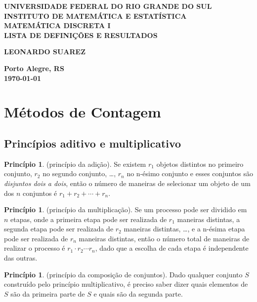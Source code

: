 \documentclass{article}
\theoremstyle{plain}
\theoremstyle{definition}
\newtheorem{prcp}[thm]{Princípio}
\theoremstyle{remark}
\begin{document}
\begin{center}
    \textbf{\large UNIVERSIDADE FEDERAL DO RIO GRANDE DO SUL} \\
    \textbf{\large INSTITUTO DE MATEMÁTICA E ESTATÍSTICA} \\
    \vspace{3cm}
    \textbf{\Large MATEMÁTICA DISCRETA I} \\
    \vspace{1cm}
    \textbf{\large LISTA DE DEFINIÇÕES E RESULTADOS} \\
    \vspace{3cm}

    \textbf{LEONARDO SUAREZ}

    \vfill
    \textbf{\large Porto Alegre, RS} \\
    \textbf{\large \today}
\end{center}

\newpage
\tableofcontents
\newpage

\section{Métodos de Contagem}

\subsection{Princípios aditivo e multiplicativo}

\begin{prcp} (princípio da adição).
    Se existem \(r_1\) objetos distintos no primeiro conjunto, \(r_2\) no segundo conjunto, \ldots, \(r_n\) no n-ésimo conjunto e esses conjuntos são \emph{disjuntos dois a dois}, então o número de maneiras de selecionar um objeto de um dos \(n\) conjuntos é \(r_1 + r_2 + \cdots + r_n\).
\end{prcp}

\begin{prcp} (princípio da multiplicação).
    Se um processo pode ser dividido em \(n\) etapas, onde a primeira etapa pode ser realizada de \(r_1\) maneiras distintas, a segunda etapa pode ser realizada de \(r_2\) maneiras distintas, \ldots, e a n-ésima etapa pode ser realizada de \(r_n\) maneiras distintas, então o número total de maneiras de realizar o processo é \(r_1 \cdot r_2 \cdots r_n\), dado que a escolha de cada etapa é independente das outras.
\end{prcp}

\begin{prcp} (princípio da composição de conjuntos).
    Dado qualquer conjunto \(S\) construído pelo princípio multiplicativo, é preciso saber dizer quais elementos de \(S\) são da primeira parte de \(S\) e quais são da segunda parte.
\end{prcp}
\end{document}
